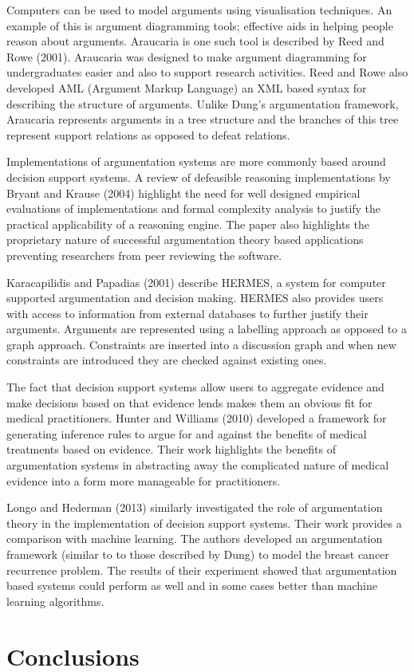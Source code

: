 Computers can be used to model arguments using visualisation techniques. An example of this is argument diagramming tools; effective aids in helping people reason about arguments. Araucaria is one such tool is described by Reed and Rowe (2001). Araucaria was designed to make argument diagramming for undergraduates easier and also to support research activities. Reed and Rowe also developed AML (Argument Markup Language) an XML based syntax for describing the structure of arguments. Unlike Dung’s argumentation framework, Araucaria represents arguments in a tree structure and the branches of this tree represent support relations as opposed to defeat relations.

Implementations of argumentation systems are more commonly based around decision support systems. A review of defeasible reasoning implementations by Bryant and Krause (2004) highlight the need for well designed empirical evaluations of implementations and formal complexity analysis to justify the practical applicability of a reasoning engine. The paper also highlights the proprietary nature of successful argumentation theory based applications preventing researchers from peer reviewing the software.

Karacapilidis and Papadias (2001) describe HERMES, a system for computer supported argumentation and decision making. HERMES also provides users with access to information from external databases to further justify their arguments. Arguments are represented using a labelling approach as opposed to a graph approach. Constraints are inserted into a discussion graph and when new constraints are introduced they are checked against existing ones.

The fact that decision support systems allow users to aggregate evidence and make decisions based on that evidence lends makes them an obvious fit for medical practitioners. Hunter and Williams (2010) developed a framework for generating inference rules to argue for and against the benefits of medical treatments based on evidence. Their work highlights the benefits of argumentation systems in abstracting away the complicated nature of medical evidence into a form more manageable for practitioners.

Longo and Hederman (2013) similarly investigated the role of argumentation theory in the implementation of decision support systems. Their work provides a comparison with machine learning. The authors developed an argumentation framework (similar to to those described by Dung) to model the breast cancer recurrence problem. The results of their experiment showed that argumentation based systems could perform as well and in some cases better than machine learning algorithms.



\section{Conclusions}
